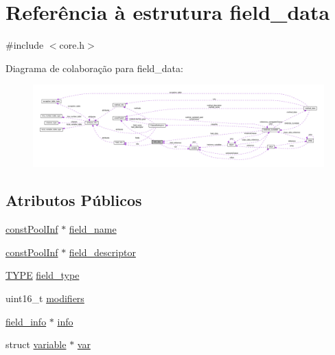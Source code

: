 \hypertarget{structfield__data}{\section{Referência à estrutura field\-\_\-data}
\label{structfield__data}
}


{\ttfamily \#include $<$core.\-h$>$}



Diagrama de colaboração para field\-\_\-data\-:\nopagebreak
\begin{figure}[H]
\begin{center}
\leavevmode
\includegraphics[width=350pt]{structfield__data__coll__graph}
\end{center}
\end{figure}
\subsection*{Atributos Públicos}
\begin{DoxyCompactItemize}
\item 
\hyperlink{structconst_pool_inf}{const\-Pool\-Inf} $\ast$ \hyperlink{structfield__data_a54a2dc5570404dfd1130871d48e2a044}{field\-\_\-name}
\item 
\hyperlink{structconst_pool_inf}{const\-Pool\-Inf} $\ast$ \hyperlink{structfield__data_a4611e29ce2251d6402952826983d17a1}{field\-\_\-descriptor}
\item 
\hyperlink{core_8h_a96376f31c362e2a289072478449290f8}{T\-Y\-P\-E} \hyperlink{structfield__data_a5cf199a1fe02916e0b0e4d27b8d3646f}{field\-\_\-type}
\item 
uint16\-\_\-t \hyperlink{structfield__data_a5d98375dcb4b589355eaf0c96a15eb12}{modifiers}
\item 
\hyperlink{structfield__info}{field\-\_\-info} $\ast$ \hyperlink{structfield__data_a216ebce6db98d903a6b50554a40459a9}{info}
\item 
struct \hyperlink{structvariable}{variable} $\ast$ \hyperlink{structfield__data_a6eb4ec12db5dba2140fff01c6d0439f8}{var}
\end{DoxyCompactItemize}


